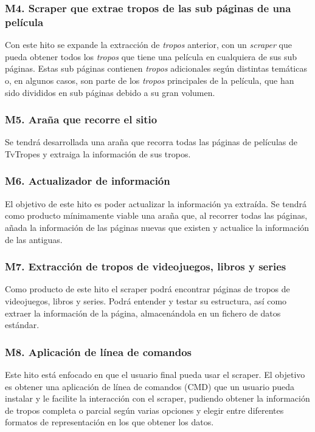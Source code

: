 \subsubsection{M4. Scraper que extrae tropos de las sub páginas de una película}
Con este hito se expande la extracción de \textit{tropos} anterior, con un
\textit{scraper} que pueda obtener todos los \textit{tropos} que tiene una
película en cualquiera de sus sub páginas. Estas sub páginas contienen
\textit{tropos} adicionales según distintas temáticas o, en algunos casos, son
parte de los \textit{tropos} principales de la película, que han sido divididos
en sub páginas debido a su gran volumen.

\subsubsection{M5. Araña que recorre el sitio}
Se tendrá desarrollada una araña que recorra todas las páginas de películas de
TvTropes y extraiga la información de sus tropos.

\subsubsection{M6. Actualizador de información}
El objetivo de este hito es poder actualizar la información ya extraída. Se
tendrá como producto mínimamente viable una araña que, al recorrer todas las
páginas, añada la información de las páginas nuevas que existen y actualice la
información de las antiguas.

\subsubsection{M7. Extracción de tropos de videojuegos, libros y series}
Como producto de este hito el scraper podrá encontrar páginas de tropos de
videojuegos, libros y series. Podrá entender y testar su estructura, así como
extraer la información de la página, almacenándola en un fichero de datos
estándar.

\subsubsection{M8. Aplicación de línea de comandos}
Este hito está enfocado en que el usuario final pueda usar el scraper. El
objetivo es obtener una aplicación de línea de comandos (CMD) que un usuario
pueda instalar y le facilite la interacción con el scraper, pudiendo obtener la
información de tropos completa o parcial según varias opciones y elegir entre
diferentes formatos de representación en los que obtener los datos.

